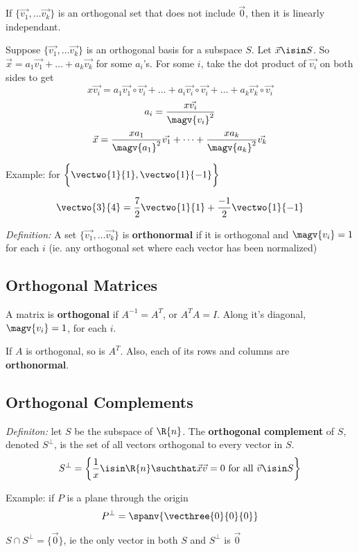 \documentclass[12pt]{article}
\begin{document}
If $\{\vec{v_1},\dots \vec{v_k}\}$ is an orthogonal set that does not include $\vec{0}$, then it is linearly independant.

Suppose $\{\vec{v_1},\dots \vec{v_k}\}$ is an orthogonal basis for a subspace $S$. Let $\vec{x}\isin S$. So $\vec{x} = a_1\vec{v_1} + \dots + a_k\vec{v_k}$ for some $a_i$'s. For some $i$, take the dot product of $\vec{v_i}$ on both sides to get \[ x\vec{v_i} = a_1\vec{v_1}\circ\vec{v_i} + \dots + a_i\vec{v_i}\circ\vec{v_i} + \dots + a_k\vec{v_k}\circ\vec{v_i} \] \[ a_i = \frac{x\vec{v_i}}{\magv{v_i}^2} \] \[ \vec{x} = \frac{xa_1}{\magv{a_1}^2}\vec{v_1} + \dots + \frac{xa_k}{\magv{a_k}^2}\vec{v_k} \]

Example: for $\bigg\{\vectwo{1}{1},\vectwo{1}{-1}\bigg\}$

\[ \vectwo{3}{4} = \frac{7}{2}\vectwo{1}{1} + \frac{-1}{2}\vectwo{1}{-1} \]

\textit{Definition:} A set $\{\vec{v_1}, \dots \vec{v_k}\}$ is {\bf orthonormal} if it is orthogonal and $\magv{v_i} = 1$ for each $i$ (ie. any orthogonal set where each vector has been normalized)


\subsection*{Orthogonal Matrices}
A matrix is {\bf orthogonal} if $A^{-1} = A^T$, or $A^TA = I$. Along it's diagonal, $\magv{v_i} = 1$, for each $i$.

If $A$ is orthogonal, so is $A^T$. Also, each of its rows and columns are {\bf orthonormal}.


\subsection*{Orthogonal Complements}
\textit{Definiton:} let $S$ be the subspace of $\R{n}$. The {\bf orthogonal complement} of $S$, denoted $S^\perp$, is the set of all vectors orthogonal to every vector in $S$. \[ S^\perp = \bigg\{\frac{1}{x}\isin\R{n}\suchthat \vec{x}\vec{v} = 0 \text{ for all } \vec{v}\isin S\bigg\} \]

Example: if $P$ is a plane through the origin \[ P^\perp = \spanv{\vecthree{0}{0}{0}} \]

$S\cap S^\perp = \{\vec{0}\}$, ie the only vector in both $S$ and $S^\perp$ is $\vec{0}$
\end{document}
